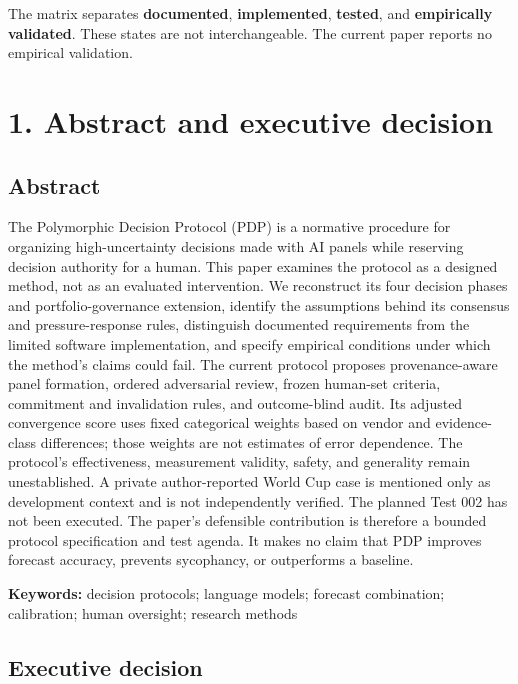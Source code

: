 \documentclass[
  english,
]{article}
\begin{document}
The matrix separates \textbf{documented}, \textbf{implemented},
\textbf{tested}, and \textbf{empirically validated}. These states are
not interchangeable. The current paper reports no empirical validation.

\section{1. Abstract and executive
decision}\label{abstract-and-executive-decision}

\subsection{Abstract}\label{abstract}

The Polymorphic Decision Protocol (PDP) is a normative procedure for
organizing high-uncertainty decisions made with AI panels while
reserving decision authority for a human. This paper examines the
protocol as a designed method, not as an evaluated intervention. We
reconstruct its four decision phases and portfolio-governance extension,
identify the assumptions behind its consensus and pressure-response
rules, distinguish documented requirements from the limited software
implementation, and specify empirical conditions under which the
method's claims could fail. The current protocol proposes
provenance-aware panel formation, ordered adversarial review, frozen
human-set criteria, commitment and invalidation rules, and outcome-blind
audit. Its adjusted convergence score uses fixed categorical weights
based on vendor and evidence-class differences; those weights are not
estimates of error dependence. The protocol's effectiveness, measurement
validity, safety, and generality remain unestablished. A private
author-reported World Cup case is mentioned only as development context
and is not independently verified. The planned Test 002 has not been
executed. The paper's defensible contribution is therefore a bounded
protocol specification and test agenda. It makes no claim that PDP
improves forecast accuracy, prevents sycophancy, or outperforms a
baseline.

\textbf{Keywords:} decision protocols; language models; forecast
combination; calibration; human oversight; research methods

\subsection{Executive decision}\label{executive-decision}
\end{document}

